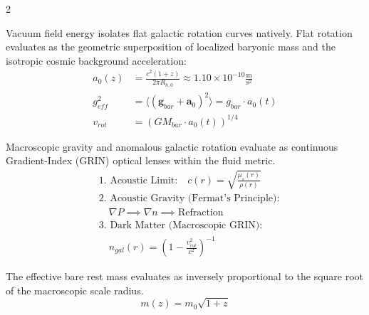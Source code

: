 \documentclass[11pt, a4paper]{article}
\newcounter{cheatnum}
\begin{document}
\begin{multicols}{2}
\begin{tcolorbox}[cheatbox, title={\refstepcounter{cheatnum}\label{box:mond}\thecheatnum. Entropic Superposition (MOND) \scriptsize\hfill\hyperref[sec:deriv_mond]{[Proof $\downarrow$]}}]
Vacuum field energy isolates flat galactic rotation curves natively. Flat rotation evaluates as the geometric superposition of localized baryonic mass and the isotropic cosmic background acceleration:
\begin{align}
    a_0(z) &= \frac{c^2(1+z)}{2\pi R_{h,0}} \approx 1.10 \times 10^{-10} \frac{\text{m}}{\text{s}^2} \label{eq:a0z} \\
    g_{eff}^2 &= \langle (\mathbf{g}_{bar} + \mathbf{a}_0)^2 \rangle = g_{bar} \cdot a_0(t) \label{eq:geff} \\
    v_{rot} &= (G M_{bar} \cdot a_0(t))^{1/4} \label{eq:vrot}
\end{align}
\end{tcolorbox}

\begin{tcolorbox}[cheatbox, title={\refstepcounter{cheatnum}\label{box:macroscopic_grin}\thecheatnum. Refractive Gravity \& Dark Matter (Macroscopic GRIN) \scriptsize\hfill\hyperref[sec:deriv_macroscopic_grin]{[Proof $\downarrow$]}}]
Macroscopic gravity and anomalous galactic rotation evaluate as continuous Gradient-Index (GRIN) optical lenses within the fluid metric.
\begin{align}
    &\text{1. Acoustic Limit:} \quad c(r) = \sqrt{\frac{\mu_s(r)}{\rho(r)}} \label{eq:acoustic_limit} \\
    &\text{2. Acoustic Gravity (Fermat's Principle):} \nonumber \\
    &\quad \nabla P \implies \nabla n \implies \text{Refraction} \label{eq:acoustic_gravity} \\
    &\text{3. Dark Matter (Macroscopic GRIN):} \nonumber \\
    &\quad n_{gal}(r) = \left( 1 - \frac{v_{rot}^2}{c^2} \right)^{-1} \label{eq:dark_matter_grin}
\end{align}
\end{tcolorbox}



\begin{tcolorbox}[cheatbox, title={\refstepcounter{cheatnum}\label{box:mass_amplification}\thecheatnum. Temporal Amplification of Mass \scriptsize\hfill\hyperref[sec:deriv_mass_amplification]{[Proof $\downarrow$]}}]
The effective bare rest mass evaluates as inversely proportional to the square root of the macroscopic scale radius.
\begin{equation}
    m(z) = m_0 \sqrt{1+z} \label{eq:mass_z}
\end{equation}
\end{tcolorbox}



\end{multicols}
\end{document}
